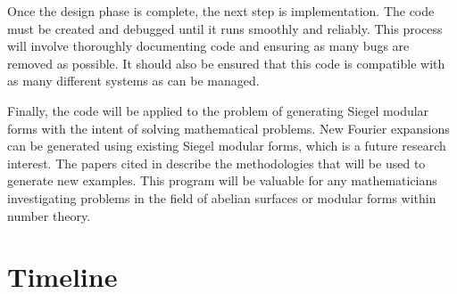 \documentclass[11pt, oneside]{amsart}
\begin{document}
Once the design phase is complete, the next step is implementation. The code must be created and debugged until it runs smoothly and reliably. This process will involve thoroughly documenting code and ensuring as many bugs are removed as possible. It should also be ensured that this code is compatible with as many different systems as can be managed.

Finally, the code will be applied to the problem of generating Siegel modular forms with the intent of solving mathematical problems. New Fourier expansions can be generated using existing Siegel modular forms, which is a future research interest. The papers cited in \cite{JR1, JR2} describe the methodologies that will be used to generate new examples. This program will be valuable for any mathematicians investigating problems in the field of abelian surfaces or modular forms within number theory.

\pagebreak

\section{Timeline}
\end{document}
